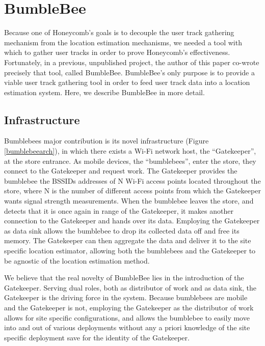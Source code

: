 \chapter{BumbleBee}
\label{bumblebee}
%

Because one of Honeycomb's goals is to decouple the user track gathering mechanism from the location estimation mechanisms, we needed a tool with which to gather user tracks in order to prove Honeycomb's effectiveness. Fortunately, in a previous, unpublished project, the author of this paper co-wrote precisely that tool, called BumbleBee. BumbleBee's only purpose is to provide a viable user track gathering tool in order to feed user track data into a location estimation system. Here, we describe BumbleBee in more detail.


\section{Infrastructure}
%

Bumblebees major contribution is its novel infrastructure (Figure \ref{bumblebeearch}), in which there exists a Wi-Fi network host, the “Gatekeeper”, at the store entrance. As mobile devices, the “bumblebees”, enter the store, they connect to the Gatekeeper and request work. The Gatekeeper provides the bumblebee the BSSIDs addresses of N Wi-Fi access points located throughout the store, where N is the number of different access points from which the Gatekeeper wants signal strength measurements. When the bumblebee leaves the store, and detects that it is once again in range of the Gatekeeper, it makes another connection to the Gatekeeper and hands over its data. Employing the Gatekeeper as data sink allows the bumblebee to drop its collected data off and free its memory. The Gatekeeper can then aggregate the data and deliver it to the site specific location estimator, allowing both the bumblebees and the Gatekeeper to be agnostic of the location estimation method.

We believe that the real novelty of BumbleBee lies in the introduction of the Gatekeeper. Serving dual roles, both as distributor of work and as data sink, the Gatekeeper is the driving force in the system. Because bumblebees are mobile and the Gatekeeper is not, employing the Gatekeeper as the distributor of work allows for site specific configurations, and allows the bumblebee to easily move into and out of various deployments without any a priori knowledge of the site specific deployment save for the identity of the Gatekeeper.


